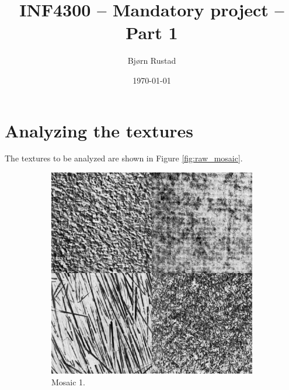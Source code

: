 \documentclass[a4paper]{article}
\title{INF4300 -- Mandatory project -- Part 1}
\author{Bjørn Rustad}
\date{\today}
\begin{document}
\maketitle

\section{Analyzing the textures}

The textures to be analyzed are shown in Figure \ref{fig:raw_mosaic}. 

\begin{figure}
    \centering
    \begin{subfigure}[b]{0.40\textwidth}
        \centering
        \includegraphics[width=\textwidth]{mosaic1.png}
        \caption{%
            Mosaic 1.
        }
    \end{subfigure}
    ~
    \begin{subfigure}[b]{0.40\textwidth}
        \centering

\end{subfigure}
\end{figure}
\end{document}
